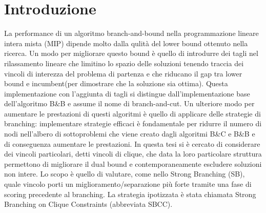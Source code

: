 \documentclass[12pt,a4paper,twoside,openright]{book}
\begin{document}
\mainmatter

\chapter{Introduzione}
La performance di un algoritmo branch-and-bound nella programmazione lineare intera mista (MIP)
dipende molto dalla qulità del lower bound ottenuto nella ricerca. Un modo per migliorare questo bound
è quello di introdurre dei tagli nel rilassamento lineare che limitino lo spazio delle soluzioni tenendo traccia
dei vincoli di interezza del problema di partenza e che riducano il gap tra lower bound e incumbent(per dimostrare che la soluzione sia ottima).
Questa implementazione con l'aggiunta di tagli si distingue dall'implementazione base dell'algoritmo B\&B e assume il nome di branch-and-cut.
Un ulteriore modo per aumentare le prestazioni di questi algoritmi è quello di applicare delle strategie
di branching: implementare strategie efficaci è fondamentale per ridurre il numero di nodi nell'albero di sottoproblemi che viene creato 
dagli algoritmi B\&C e B\&B e di conseguenza aumentare le prestazioni.
In questa tesi si è cercato di considerare dei vincoli particolari, detti vincoli di clique,
che data la loro particolare struttura permettono di migliorare il dual bound e contemporaneamente escludere 
soluzioni non intere. Lo scopo è quello di valutare, come nello Strong Branching (SB), quale vincolo porti un 
miglioramento/separazione più forte tramite una fase di scoring precedente al branching. La strategia
ipotizzata è stata chiamata Strong Branching on Clique Constraints (abbreviata SBCC).
\end{document}

